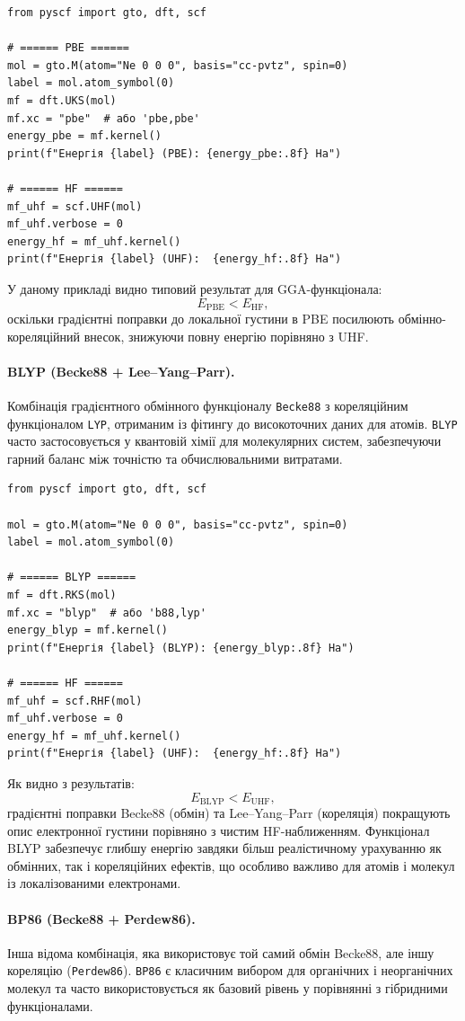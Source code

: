 \begin{verbatim}
from pyscf import gto, dft, scf

# ====== PBE ======
mol = gto.M(atom="Ne 0 0 0", basis="cc-pvtz", spin=0)
label = mol.atom_symbol(0)
mf = dft.UKS(mol)
mf.xc = "pbe"  # або 'pbe,pbe'
energy_pbe = mf.kernel()
print(f"Енергія {label} (PBE): {energy_pbe:.8f} Ha")

# ====== HF ======
mf_uhf = scf.UHF(mol)
mf_uhf.verbose = 0
energy_hf = mf_uhf.kernel()
print(f"Енергія {label} (UHF):  {energy_hf:.8f} Ha")
\end{verbatim}
У даному прикладі видно типовий результат для GGA-функціонала:
\[
E_{\text{PBE}} < E_{\text{HF}},
\]
оскільки градієнтні поправки до локальної густини в PBE посилюють
обмінно-кореляційний внесок, знижуючи повну енергію порівняно з UHF.


\paragraph{BLYP (Becke88 + Lee–Yang–Parr).}
Комбінація градієнтного обмінного функціоналу \texttt{Becke88} з кореляційним функціоналом \texttt{LYP}, отриманим із фітингу до високоточних даних для атомів.
\texttt{BLYP} часто застосовується у квантовій хімії для молекулярних систем, забезпечуючи гарний баланс між точністю та обчислювальними витратами.

\begin{verbatim}
from pyscf import gto, dft, scf

mol = gto.M(atom="Ne 0 0 0", basis="cc-pvtz", spin=0)
label = mol.atom_symbol(0)

# ====== BLYP ======
mf = dft.RKS(mol)
mf.xc = "blyp"  # або 'b88,lyp'
energy_blyp = mf.kernel()
print(f"Енергія {label} (BLYP): {energy_blyp:.8f} Ha")

# ====== HF ======
mf_uhf = scf.RHF(mol)
mf_uhf.verbose = 0
energy_hf = mf_uhf.kernel()
print(f"Енергія {label} (UHF):  {energy_hf:.8f} Ha")
\end{verbatim}

Як видно з результатів:
\[
E_{\text{BLYP}} < E_{\text{UHF}},
\]
градієнтні поправки Becke88 (обмін) та Lee–Yang–Parr (кореляція)
покращують опис електронної густини порівняно з чистим HF-наближенням.
Функціонал BLYP забезпечує глибшу енергію завдяки більш реалістичному
урахуванню як обмінних, так і кореляційних ефектів, що особливо важливо
для атомів і молекул із локалізованими електронами.

\paragraph{BP86 (Becke88 + Perdew86).}
Інша відома комбінація, яка використовує той самий обмін Becke88, але іншу кореляцію (\texttt{Perdew86}).
\texttt{BP86} є класичним вибором для органічних і неорганічних молекул та часто використовується як базовий рівень у порівнянні з гібридними функціоналами.

